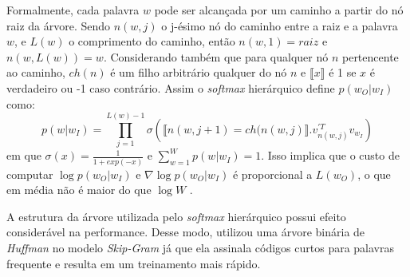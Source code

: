 Formalmente, cada palavra $w$ pode ser alcançada por um caminho a partir do nó raiz da árvore. Sendo $n(w, j)$ o j-ésimo nó do caminho entre a raiz e a palavra $w$, e $L(w)$ o comprimento do caminho, então $n(w, 1) = raiz$ e $n(w, L(w)) = w$. Considerando também que para qualquer nó $n$ pertencente ao caminho, $ch(n)$ é um filho arbitrário qualquer do nó $n$ e $\llbracket x \rrbracket$ é 1 se $x$ é verdadeiro ou -1 caso contrário. Assim o \textit{softmax} hierárquico define $p(w_O|w_I)$ como:
\begin{equation}
    \label{eq:softmax_hierárquivo}
    p(w|w_I) = \prod_{j=1}^{L(w) - 1} \sigma \left ( \llbracket n(w, j + 1) = ch(n(w, j) \rrbracket . v_{n(w, j)}^{\prime T} v_{w_I} \right )
\end{equation}
em que $\sigma(x) = \frac{1}{1 + exp(-x)}$ e $\sum_{w=1}^{W} p(w|w_I) = 1$. Isso implica que o custo de computar $\log p(w_O|w_I)$  e $\nabla \log p (w_O|w_I)$ é proporcional a $L(w_O)$, o que em média não é maior do que $\log W$ \cite{Mikolov2013DistributedRepresentations}.

A estrutura da árvore utilizada pelo \textit{softmax} hierárquico possui efeito considerável na performance. Desse modo, \textcite{Mikolov2013DistributedRepresentations} utilizou uma árvore binária de \textit{Huffman} no modelo \textit{Skip-Gram} já que ela assinala códigos curtos para palavras frequente e resulta em um treinamento mais rápido.

